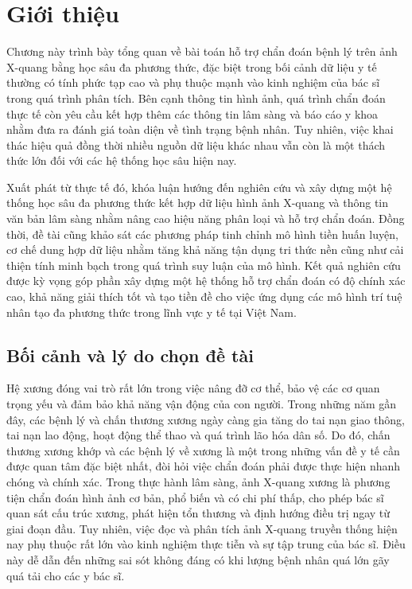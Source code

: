 \chapter{Giới thiệu}
Chương này trình bày tổng quan về bài toán hỗ trợ chẩn đoán bệnh lý trên ảnh X-quang bằng học sâu đa phương thức, 
đặc biệt trong bối cảnh dữ liệu y tế thường có tính phức tạp cao và phụ thuộc mạnh vào kinh nghiệm của bác sĩ 
trong quá trình phân tích. Bên cạnh thông tin hình ảnh, quá trình chẩn đoán thực tế còn yêu cầu kết hợp thêm 
các thông tin lâm sàng và báo cáo y khoa nhằm đưa ra đánh giá toàn diện về tình trạng bệnh nhân. 
Tuy nhiên, việc khai thác hiệu quả đồng thời nhiều nguồn dữ liệu khác nhau vẫn còn là một thách thức lớn 
đối với các hệ thống học sâu hiện nay.

Xuất phát từ thực tế đó, khóa luận hướng đến nghiên cứu và xây dựng một hệ thống học sâu đa phương thức 
kết hợp dữ liệu hình ảnh X-quang và thông tin văn bản lâm sàng nhằm nâng cao hiệu năng phân loại và hỗ trợ chẩn đoán. 
Đồng thời, đề tài cũng khảo sát các phương pháp tinh chỉnh mô hình tiền huấn luyện, 
cơ chế dung hợp dữ liệu nhằm tăng khả năng tận dụng tri thức nền cũng như cải thiện tính minh bạch 
trong quá trình suy luận của mô hình. Kết quả nghiên cứu được kỳ vọng góp phần xây dựng một hệ thống hỗ trợ chẩn đoán 
có độ chính xác cao, khả năng giải thích tốt và tạo tiền đề cho việc ứng dụng các mô hình trí tuệ nhân tạo đa phương thức 
trong lĩnh vực y tế tại Việt Nam.
\label{Chapter1}

\pagebreak

\section{Bối cảnh và lý do chọn đề tài}
Hệ xương đóng vai trò rất lớn trong việc nâng đỡ cơ thể, bảo vệ các cơ quan trọng yếu và đảm bảo khả năng vận động của con người. 
Trong những năm gần đây, các bệnh lý và chấn thương xương ngày càng gia tăng do tai nạn giao thông, 
tai nạn lao động, hoạt động thể thao và quá trình lão hóa dân số.
Do đó, chấn thương xương khớp và các bệnh lý về xương là một trong những vấn đề y tế cần được quan tâm đặc biệt nhất, 
đòi hỏi việc chẩn đoán phải được thực hiện nhanh chóng và chính xác. Trong thực hành lâm sàng, 
ảnh X-quang xương là phương tiện chẩn đoán hình ảnh cơ bản, phổ biến và có chi phí thấp, 
cho phép bác sĩ quan sát cấu trúc xương, phát hiện tổn thương và định hướng điều trị ngay từ giai đoạn đầu. 
Tuy nhiên, việc đọc và phân tích ảnh X-quang truyền thống hiện nay phụ thuộc rất lớn vào kinh nghiệm thực tiễn 
và sự tập trung của bác sĩ. Điều này dễ dẫn đến những sai sót không đáng có khi lượng bệnh nhân quá lớn gãy quá tải cho các y bác sĩ. 

